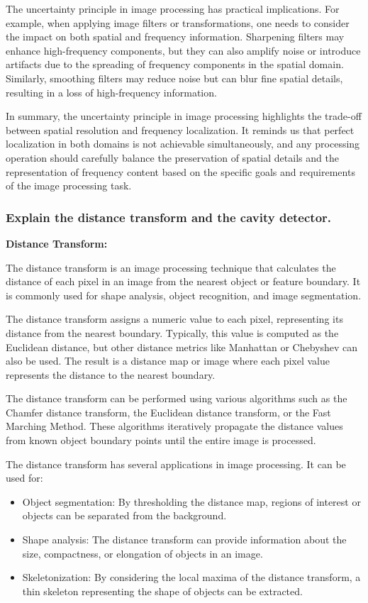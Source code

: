\documentclass{article}
\begin{document}
The uncertainty principle in image processing has practical implications. For example, when applying image filters or transformations, one needs to consider the impact on both spatial and frequency information. Sharpening filters may enhance high-frequency components, but they can also amplify noise or introduce artifacts due to the spreading of frequency components in the spatial domain. Similarly, smoothing filters may reduce noise but can blur fine spatial details, resulting in a loss of high-frequency information.

In summary, the uncertainty principle in image processing highlights the trade-off between spatial resolution and frequency localization. It reminds us that perfect localization in both domains is not achievable simultaneously, and any processing operation should carefully balance the preservation of spatial details and the representation of frequency content based on the specific goals and requirements of the image processing task.

\subsubsection{Explain the distance transform and the cavity detector.}
\textbf{Distance Transform:}

The distance transform is an image processing technique that calculates the distance of each pixel in an image from the nearest object or feature boundary. It is commonly used for shape analysis, object recognition, and image segmentation.

The distance transform assigns a numeric value to each pixel, representing its distance from the nearest boundary. Typically, this value is computed as the Euclidean distance, but other distance metrics like Manhattan or Chebyshev can also be used. The result is a distance map or image where each pixel value represents the distance to the nearest boundary.

The distance transform can be performed using various algorithms such as the Chamfer distance transform, the Euclidean distance transform, or the Fast Marching Method. These algorithms iteratively propagate the distance values from known object boundary points until the entire image is processed.

The distance transform has several applications in image processing. It can be used for:
\begin{itemize}
    \item Object segmentation: By thresholding the distance map, regions of interest or objects can be separated from the background.
    \item Shape analysis: The distance transform can provide information about the size, compactness, or elongation of objects in an image.
    \item Skeletonization: By considering the local maxima of the distance transform, a thin skeleton representing the shape of objects can be extracted.
\end{itemize}
\end{document}
